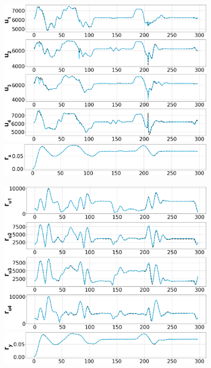 \begin{figure}[t]
    \centering
    \begin{subfigure}{0.49\linewidth}
         \centering
    \includegraphics[width=\linewidth]{figures/learning_quadrotor/pred_u.png}
    \includegraphics[width=\linewidth]{figures/learning_quadrotor/pred_rx.png}
    \end{subfigure}
    \begin{subfigure}{0.49\linewidth}
         \centering
    \includegraphics[width=\linewidth]{figures/learning_quadrotor/pred_ru.png}
    \includegraphics[width=\linewidth]{figures/learning_quadrotor/pred_ry.png}

\end{subfigure}
\end{figure}
